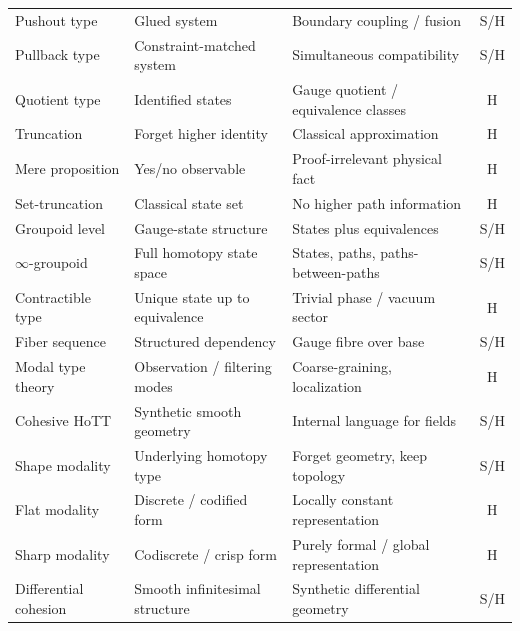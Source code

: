 \documentclass[12pt]{article}
\theoremstyle{definition}
\theoremstyle{remark}
\begin{document}
\begin{longtable}{@{}L{3.9cm}L{4.3cm}L{3.2cm}c@{}}
Pushout type & Glued system & Boundary coupling / fusion & S/H\\
Pullback type & Constraint-matched system & Simultaneous compatibility & S/H\\
Quotient type & Identified states & Gauge quotient / equivalence classes & H\\
Truncation & Forget higher identity & Classical approximation & H\\
Mere proposition & Yes/no observable & Proof-irrelevant physical fact & H\\
Set-truncation & Classical state set & No higher path information & H\\
Groupoid level & Gauge-state structure & States plus equivalences & S/H\\
$\infty$-groupoid & Full homotopy state space & States, paths, paths-between-paths & S/H\\
Contractible type & Unique state up to equivalence & Trivial phase / vacuum sector & H\\
Fiber sequence & Structured dependency & Gauge fibre over base & S/H\\
Modal type theory & Observation / filtering modes & Coarse-graining, localization & H\\
Cohesive HoTT & Synthetic smooth geometry & Internal language for fields & S/H\\
Shape modality & Underlying homotopy type & Forget geometry, keep topology & S/H\\
Flat modality & Discrete / codified form & Locally constant representation & H\\
Sharp modality & Codiscrete / crisp form & Purely formal / global representation & H\\
Differential cohesion & Smooth infinitesimal structure & Synthetic differential geometry & S/H\\
\end{longtable}
\end{document}
